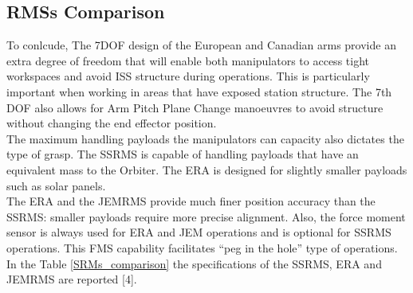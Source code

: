 \documentclass[a4paper,12pt,oneside]{report}
\begin{document}
\subsection{RMSs Comparison}
To conlcude, The 7DOF design of the European and Canadian arms provide an extra degree of freedom that will enable both manipulators to access tight workspaces and avoid ISS structure during operations. This is particularly important when working in areas that have exposed station structure. The 7th DOF also allows for Arm Pitch Plane Change manoeuvres to avoid structure without changing the end effector position.\\
The maximum handling payloads the manipulators can capacity also dictates the type of grasp. The SSRMS is capable of handling payloads that have an equivalent mass to the Orbiter. The ERA is designed for slightly smaller payloads such as solar panels.\\
The ERA and the JEMRMS provide much finer position accuracy than the SSRMS: smaller payloads require more precise alignment. Also, the force moment sensor is always used for ERA and JEM operations and is optional for SSRMS operations. This FMS capability facilitates “peg in the hole” type of operations.
In the Table \ref{SRMs_comparison} the specifications of the SSRMS, ERA and JEMRMS are reported [4].
\end{document}

